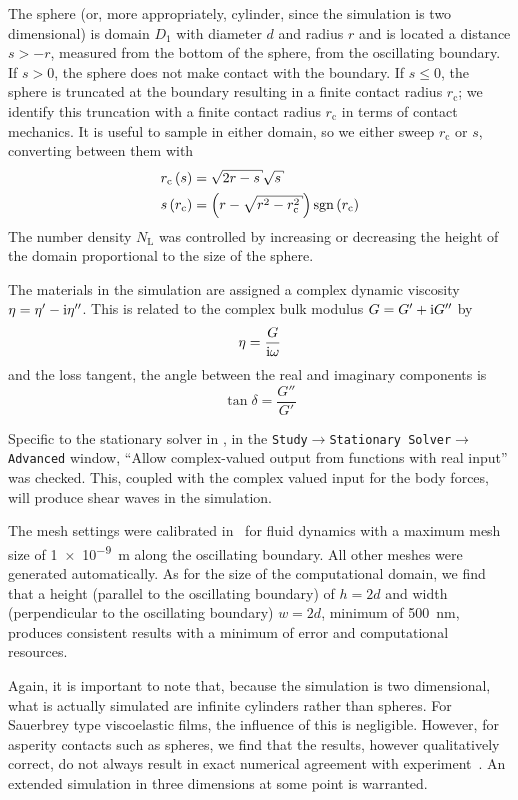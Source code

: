 The sphere (or, more appropriately, cylinder, since the simulation is two
dimensional) is domain $D_1$ with diameter $d$ and radius $r$ and is
located a distance $s>-r$, measured from the bottom of the sphere, from the
oscillating boundary.  If $s>0$, the sphere does not make contact with the
boundary.  If $s\leq0$, the sphere is truncated at the boundary resulting
in a finite contact radius $r_\mathrm{c}$; we identify this truncation with
a finite contact radius $r_\mathrm{c}$ in terms of contact mechanics.
It is useful to sample in either domain, so
we either sweep $r_\mathrm{c}$ or $s$, converting between them with
\begin{align}
 r_\mathrm{c}\left(s\right) &= \sqrt{2r-s}\sqrt{s}\\
 s\left(r_\mathrm{c}\right) &= \left(r-\sqrt{r^2-r_\mathrm{c}^2}\right)\sgn\left(r_\mathrm{c}\right)
\end{align}
The number density $N_\mathrm{L}$ was controlled by increasing or
decreasing the height of the domain proportional to the size of the sphere.

The materials in the simulation are assigned a complex dynamic viscosity
$\eta = \eta'-{\mathrm{i}}\eta''$.  This is related to the complex bulk modulus
$G=G'+{\mathrm{i}} G''$ by
\begin{align}
 \eta = \frac{G}{{\mathrm{i}} \omega}
\end{align}
and the loss tangent, the angle between the real and imaginary components
is 
\begin{equation}
 \tan \delta = \frac{G''}{G'}
\end{equation}

Specific to the stationary solver in \comsol, in the
\texttt{Study$\rightarrow$Stationary Solver$\rightarrow$Advanced} window,
``Allow complex-valued output from functions with real input'' was checked.
This, coupled with the complex valued input for the body forces, will
produce shear waves in the simulation.

The mesh settings were calibrated in \comsol~for fluid dynamics with a
maximum mesh size of \SI{1e-9}{\meter} along the oscillating boundary.  All
other meshes were generated automatically.  As for the size of the
computational domain, we find that a height (parallel to the oscillating
boundary) of $h=2d$ and width (perpendicular to the oscillating boundary)  
$w=2d$, minimum of \SI{500}{\nano\meter}, produces consistent results with a
minimum of error and computational resources.

Again, it is important to note that, because the simulation is two
dimensional, what is actually simulated are infinite cylinders rather than
spheres.  For Sauerbrey type viscoelastic films, the influence of this is
negligible.  However, for asperity contacts such as spheres, we find that
the results, however qualitatively correct, do not always result in exact
numerical agreement with experiment~\cite{Vittorias2010489}.  An extended
simulation in three dimensions at some point is warranted.

